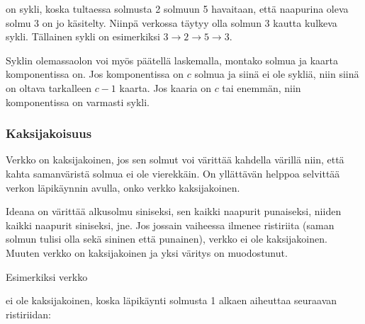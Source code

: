on sykli, koska tultaessa solmusta 2 solmuun 5
havaitaan, että naapurina oleva solmu 3 on jo käsitelty.
Niinpä verkossa täytyy olla solmun 3 kautta
kulkeva sykli.
Tällainen sykli on esimerkiksi
$3 \rightarrow 2 \rightarrow 5 \rightarrow 3$.

Syklin olemassaolon voi myös päätellä laskemalla,
montako solmua ja kaarta komponentissa on.
Jos komponentissa on $c$ solmua ja siinä ei ole sykliä,
niin siinä on oltava tarkalleen $c-1$ kaarta.
Jos kaaria on $c$ tai enemmän, niin komponentissa
on varmasti sykli.

\subsubsection{Kaksijakoisuus}


Verkko on kaksijakoinen,
jos sen solmut voi värittää
kahdella värillä
niin, että kahta samanväristä
solmua ei ole vierekkäin.
On yllättävän helppoa selvittää
verkon läpikäynnin avulla,
onko verkko kaksijakoinen.

Ideana on värittää alkusolmu
siniseksi, sen kaikki naapurit
punaiseksi, niiden kaikki naapurit
siniseksi, jne.
Jos jossain vaiheessa
ilmenee ristiriita
(saman solmun tulisi olla sekä
sininen että punainen),
verkko ei ole kaksijakoinen.
Muuten verkko on kaksijakoinen
ja yksi väritys on muodostunut.

Esimerkiksi verkko

\begin{center}
\end{center}

ei ole kaksijakoinen, koska
läpikäynti solmusta 1 alkaen
aiheuttaa seuraavan ristiriidan:

